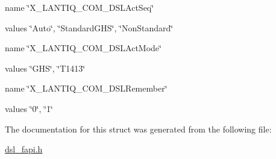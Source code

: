 \begin{DoxyItemize}
\item name \char`\"{}\-X\-\_\-\-L\-A\-N\-T\-I\-Q\-\_\-\-C\-O\-M\-\_\-\-D\-S\-L\-Act\-Seq\char`\"{}
\item values \char`\"{}\-Auto\char`\"{}, \char`\"{}\-Standard\-G\-H\-S\char`\"{}, \char`\"{}\-Non\-Standard\char`\"{}
\item name \char`\"{}\-X\-\_\-\-L\-A\-N\-T\-I\-Q\-\_\-\-C\-O\-M\-\_\-\-D\-S\-L\-Act\-Mode\char`\"{}
\item values \char`\"{}\-G\-H\-S\char`\"{}, \char`\"{}\-T1413\char`\"{}
\item name \char`\"{}\-X\-\_\-\-L\-A\-N\-T\-I\-Q\-\_\-\-C\-O\-M\-\_\-\-D\-S\-L\-Remember\char`\"{}
\item values \char`\"{}0\char`\"{}, \char`\"{}1\char`\"{} 
\end{DoxyItemize}

The documentation for this struct was generated from the following file\-:\begin{DoxyCompactItemize}
\item 
\hyperlink{dsl__fapi_8h}{dsl\-\_\-fapi.\-h}\end{DoxyCompactItemize}
